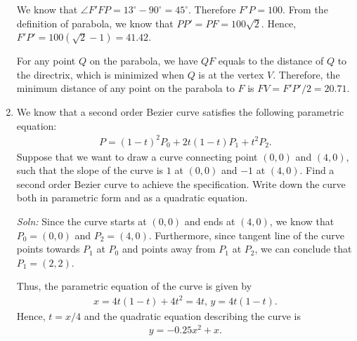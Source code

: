 \documentclass{article}
\begin{document}
\begin{enumerate}
We know that $\angle F'FP = 13^\circ - 90^\circ = 45^\circ$. Therefore $F'P = 100$. From the definition of parabola, we know that $PP' = PF = 100\sqrt{2}$. Hence, $F'P' = 100(\sqrt{2}-1) = 41.42$.

For any point $Q$ on the parabola, we have $QF$ equals to the distance of $Q$ to the directrix, which is minimized when $Q$ is at the vertex $V$. Therefore, the minimum distance of any point on the parabola to $F$ is $FV = F'P'/2 = 20.71$.
\newpage
\item We know that a second order Bezier curve satisfies the following parametric equation:
\begin{align*}
  P = (1-t)^2P_0 + 2t(1-t)P_1 + t^2 P_2.
\end{align*}
Suppose that we want to draw a curve connecting point $(0,0)$ and $(4,0)$, such that the slope of the curve is $1$ at $(0,0)$ and $-1$ at $(4,0)$. Find a second order Bezier curve to achieve the specification. Write down the curve both in parametric form and as a quadratic equation.

\begin{figure}[h]
  \centering
\end{figure}

\emph{Soln:} Since the curve starts at $(0,0)$ and ends at $(4,0)$, we know that $P_0 = (0,0)$ and $P_2 = (4,0)$. Furthermore, since tangent line of the curve points towards $P_1$ at $P_0$ and points away from $P_1$ at $P_2$, we can conclude that $P_1 = (2,2)$.

Thus, the parametric equation of the curve is given by
\begin{align*}
  x = 4t(1-t) + 4t^2 = 4t,\,y = 4t(1-t).
\end{align*}
Hence, $t = x/4$ and the quadratic equation describing the curve is
\begin{align*}
 y = -0.25x^2 + x. 
\end{align*}



\end{enumerate}
\end{document}
